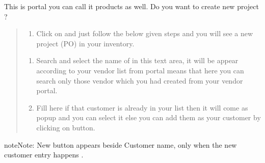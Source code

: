\documentclass[letterpaper,10pt,english]{sphinxmanual}
\begin{document}
This is  portal you can call it products as well. Do you want to create new project ?
\begin{quote}
\begin{enumerate}
\item {} 
Click on  and just follow the below given steps and you will see a new project (PO) in your inventory.

\end{enumerate}
\begin{enumerate}
\item {} 
Search and select the name of  in this text area, it will be appear according to your vendor list from  portal means that here you can search only those vendor which you had created from your vendor portal.

\item {} 
Fill  here if that customer is already in your list then it will come as popup and you can select it else you can add them as your customer by clicking on  button.

\end{enumerate}
\end{quote}

\begin{sphinxadmonition}{note}{Note:}
New button appears beside Customer name, only when the new customer entry happens .
\end{sphinxadmonition}

\begin{figure}[htbp]
\centering

\noindent{}
\end{figure}
\end{document}
